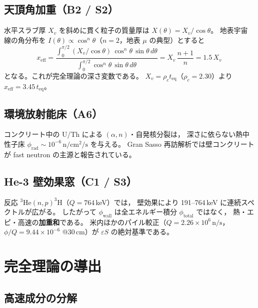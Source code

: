 \documentclass[a4paper,11pt]{ltjsarticle}
\begin{document}
\subsection{天頂角加重（B2 / S2）}

水平スラブ厚 $X_v$ を斜めに貫く粒子の質量厚は $X(\theta)=X_v/\cos\theta$。
地表宇宙線の角分布を $I(\theta)\propto\cos^n\theta$（$n=2$，地表 $\mu$ の典型\cite{Gaisser2016}）とすると
\begin{equation}
  x_{\mathrm{eff}}
  = \frac{\displaystyle\int_0^{\pi/2} (X_v/\cos\theta)\,\cos^n\theta\,\sin\theta\,d\theta}
         {\displaystyle\int_0^{\pi/2} \cos^n\theta\,\sin\theta\,d\theta}
  = X_v\,\frac{n+1}{n}
  = 1.5\,X_v
  \label{eq:xeff-der}
\end{equation}
となる\cite{S2}。これが完全理論の深さ変数である。
$X_v=\rho_c t_{\mathrm{eq}}$（$\rho_c=2.30$）より $x_{\mathrm{eff}}=3.45\,t_{\mathrm{eq}}$。

\subsection{環境放射能床（A6）}

コンクリート中の U/Th による $(\alpha,n)$・自発核分裂は，
深さに依らない熱中性子床 $\phi_{\mathrm{rad}}\sim10^{-6}\,\mathrm{n/cm^2/s}$ を与える\cite{Malins2017,Wulandari2004}。
Gran Sasso 再訪解析では壁コンクリートが fast neutron の主源と報告されている\cite{Wulandari2004}。

\subsection{He-3 壁効果窓（C1 / S3）}

反応 $^3\mathrm{He}(n,p)^3\mathrm{H}$（$Q=764$\,keV）では，
壁効果により 191--764\,keV に連続スペクトルが広がる\cite{Knoll}。
したがって $\phi_{\mathrm{wall}}$ は全エネルギー積分 $\phi_{\mathrm{total}}$ ではなく，
熱・エピ・高速の\textbf{加重和}である。
米内ほか\cite{yoneuchi2002}のパイル較正（$Q=2.26\times10^{6}\,\mathrm{n/s}$，
$\phi/Q=9.44\times10^{-6}$ @30\,cm）が $\varepsilon S$ の絶対基準である。

\section{完全理論の導出}

\subsection{高速成分の分解}
\end{document}
